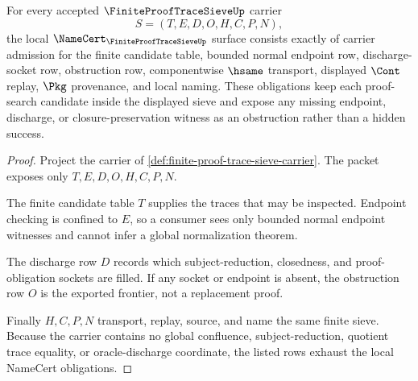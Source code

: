 \begin{theorem}
\label{thm:finite-proof-trace-sieve-namecert-obligations}
For every accepted $\FiniteProofTraceSieveUp$ carrier
$$
S=(T,E,D,O,H,C,P,N),
$$
the local $\NameCert_{\FiniteProofTraceSieveUp}$ surface consists exactly of carrier admission for the finite candidate table, bounded normal endpoint row, discharge-socket row, obstruction row, componentwise $\hsame$ transport, displayed $\Cont$ replay, $\Pkg$ provenance, and local naming. These obligations keep each proof-search candidate inside the displayed sieve and expose any missing endpoint, discharge, or closure-preservation witness as an obstruction rather than a hidden success.
\end{theorem}
\begin{proof}
Project the carrier of \autoref{def:finite-proof-trace-sieve-carrier}. The packet exposes only $T,E,D,O,H,C,P,N$.

The finite candidate table $T$ supplies the traces that may be inspected. Endpoint checking is confined to $E$, so a consumer sees only bounded normal endpoint witnesses and cannot infer a global normalization theorem.

The discharge row $D$ records which subject-reduction, closedness, and proof-obligation sockets are filled. If any socket or endpoint is absent, the obstruction row $O$ is the exported frontier, not a replacement proof.

Finally $H,C,P,N$ transport, replay, source, and name the same finite sieve. Because the carrier contains no global confluence, subject-reduction, quotient trace equality, or oracle-discharge coordinate, the listed rows exhaust the local NameCert obligations.
\end{proof}

